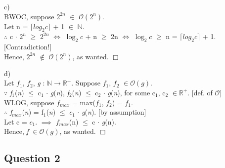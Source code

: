\documentclass[fleqn]{article}
\newcommand{\bigo}[1]{\mathcal{O}(#1)}
\newcommand{\ital}{\itshape{}}
\begin{document}
\noindent
c) \\
BWOC, suppose $2^{2n}$ $\in$ $\bigo{2^n}$. \\
Let n = $\lceil{log_2{c}}\rceil$ + 1 $\in$ $\mathbb{N}$. \\

\noindent $\therefore$
c $\cdot$ $2^n$ $\geq$ $2^{2n}$ $\Leftrightarrow$ 
$\log_2{c}$ + n $\geq$ 2n $\Leftrightarrow$
$\log_2{c}$ $\geq$ n = $\lceil{log_2{c}}\rceil$ + 1.
[Contradiction!] \\

\noindent
Hence, $2^{2n}$ $\notin$ $\bigo{2^n}$, as wanted. $\Box$ \pagebreak

\noindent
d) \\
Let {\itshape $f_1$}, {\itshape $f_2$}, {\itshape g} : 
$\mathbb{N} \rightarrow \mathbb{R^+}$.
Suppose {\itshape $f_1$}, {\itshape $f_2$} $\in \bigo{g}$. \\

\noindent $\because$ 
{\itshape f$_1$}({\ital n}) $\leq$ c$_{1}$ $\cdot$ {\itshape g}({\ital n}),
{\itshape f$_2$}({\ital n}) $\leq$ c$_{2}$ $\cdot$ {\itshape g}({\ital n}),
for some c$_{1}$, c$_{2}$ $\in \mathbb{R^{+}}$. [def. of $\mathcal{O}$] \\

\noindent
WLOG, suppose $f_{max}$ = max($f_1$, $f_2$) = $f_1$. \\

\noindent $\therefore$
{\ital f$_{max}$}({\ital n}) = f$_{1}$({\ital n}) $\leq$
$c_1$ $\cdot$ {\ital g}({\ital n}).
[by assumption] \\

\noindent
Let c = $c_1$.
$\implies$ {\ital $f_{max}$}(n) $\leq$ c $\cdot$ {\ital g}(n). \\
Hence, {\ital f} $\in \bigo{g}$, as wanted. $\Box$ \pagebreak

\subsection*{Question 2}
\end{document}
